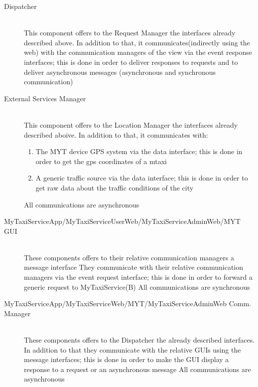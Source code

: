 \documentclass[11pt,titlepage]{article} %
\begin{document}
\begin{description}
      \item [Dispatcher] \hfill \\
          This component offers to the Request Manager the interfaces already described above.
          In addition to that, it communicates(indirectly using the web) with the communication managers of the view
          via the event response interfaces; this is done in order to deliver responses to requests and to deliver asynchronous messages
          (asynchronous and synchronous communication)

      \item [External Services Manager] \hfill \\
          This component offers to the Location Manager the interfaces already described aboive.
          In addition to that, it communicates with:
	\begin{enumerate}
	          \item The MYT device GPS system via the data interface; this is done in order to get the gps coordinates of a mtaxi
	          \item A generic traffic source via the data interface; this is done in order to get raw data about the traffic
	          conditions of the city
	\end{enumerate}
          All communications are asynchronous

      \item [MyTaxiServiceApp/MyTaxiServiceUserWeb/MyTaxiServiceAdminWeb/MYT GUI] \hfill \\
          These components offers to their relative communication managers a message interface
          They communicate with their relative communication managers via the event request interface; this is
          done in order to forward a generic request to MyTaxiService(B)
          All communications are synchronous

      \item [MyTaxiServiceApp/MyTaxiServiceWeb/MYT/MyTaxiServiceAdminWeb Comm. Manager] \hfill \\
          These components offers to the Dispatcher the already described interfaces. In addition to that
          they communicate with the relative GUIs using the message interfaces; this is done in order
          to make the GUI display a response to a request or an asynchronous message
          All communications are asynchronous

\end{description}
\end{document}

